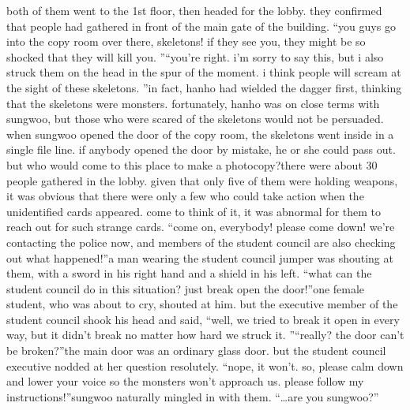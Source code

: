 both of them went to the 1st floor, then headed for the lobby.
 they confirmed that people had gathered in front of the main gate of the building.
“you guys go into the copy room over there, skeletons! if they see you, they might be so shocked that they will kill you.
”“you’re right.
 i’m sorry to say this, but i also struck them on the head in the spur of the moment.
 i think people will scream at the sight of these skeletons.
”in fact, hanho had wielded the dagger first, thinking that the skeletons were monsters.
 fortunately, hanho was on close terms with sungwoo, but those who were scared of the skeletons would not be persuaded.
when sungwoo opened the door of the copy room, the skeletons went inside in a single file line.
 if anybody opened the door by mistake, he or she could pass out.
 but who would come to this place to make a photocopy?there were about 30 people gathered in the lobby.
 given that only five of them were holding weapons, it was obvious that there were only a few who could take action when the unidentified cards appeared.
come to think of it, it was abnormal for them to reach out for such strange cards.
“come on, everybody! please come down! we’re contacting the police now, and members of the student council are also checking out what happened!”a man wearing the student council jumper was shouting at them, with a sword in his right hand and a shield in his left.
“what can the student council do in this situation? just break open the door!”one female student, who was about to cry, shouted at him.
but the executive member of the student council shook his head and said, “well, we tried to break it open in every way, but it didn’t break no matter how hard we struck it.
”“really? the door can’t be broken?”the main door was an ordinary glass door.
but the student council executive nodded at her question resolutely.
“nope, it won’t.
 so, please calm down and lower your voice so the monsters won’t approach us.
 please follow my instructions!”sungwoo naturally mingled in with them.
“…are you sungwoo?”

 
